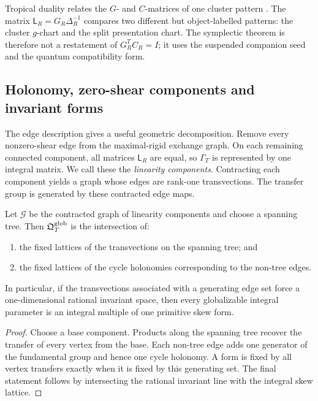 \begin{remark}
Tropical duality relates the $G$- and $C$-matrices of one cluster pattern
\cite{NakanishiZelevinsky}.  The matrix $\mathsf L_R=G_R\Delta_R^{-1}$
compares two different but object-labelled patterns: the cluster $g$-chart and
the split presentation chart.  The symplectic theorem is therefore not a
restatement of $G_R^TC_R=I$; it uses the suspended companion seed and the
quantum compatibility form.
\end{remark}

\subsection{Holonomy, zero-shear components and invariant forms}

The edge description gives a useful geometric decomposition.  Remove every
nonzero-shear edge from the maximal-rigid exchange graph.  On each remaining
connected component, all matrices $\mathsf L_R$ are equal, so $\Gamma_T$ is
represented by one integral matrix.  We call these the \emph{linearity
components}.  Contracting each component yields a graph whose edges are
rank-one transvections.  The transfer group is generated by these contracted
edge maps.

\begin{proposition}
\label{prop:holonomy-fixed}
Let $\mathcal G$ be the contracted graph of linearity components and choose a
spanning tree.  Then $\mathfrak Q^{\mathrm{glob}}_T$ is the intersection of:
\begin{enumerate}[label=(\roman*),leftmargin=2.3em]
\item the fixed lattices of the transvections on the spanning tree; and
\item the fixed lattices of the cycle holonomies corresponding to the
      non-tree edges.
\end{enumerate}
In particular, if the transvections associated with a generating edge set
force a one-dimensional rational invariant space, then every globalizable
integral parameter is an integral multiple of one primitive skew form.
\end{proposition}

\begin{proof}
Choose a base component.  Products along the spanning tree recover the
transfer of every vertex from the base.  Each non-tree edge adds one generator
of the fundamental group and hence one cycle holonomy.  A form is fixed by all
vertex transfers exactly when it is fixed by this generating set.  The final
statement follows by intersecting the rational invariant line with the
integral skew lattice.
\end{proof}

